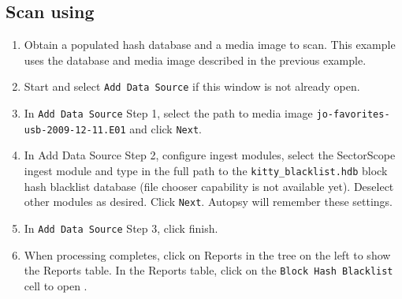 \documentclass[11pt,fleqn]{article} %
\begin{document}
\subsection{Scan using \aut}
\begin{enumerate}
\item Obtain a populated hash database and a media image to scan. This example uses the database and media image described in the previous example.
\item Start \aut and select \verb+Add Data Source+ if this window is not already open.
\item In \verb+Add Data Source+ Step 1, select the path to media image \verb+jo-favorites-usb-2009-12-11.E01+ and click \verb+Next+.
\item In Add Data Source Step 2, configure ingest modules, select the SectorScope ingest module and type in the full path to the \verb+kitty_blacklist.hdb+ block hash blacklist database (file chooser capability is not available yet). Deselect other modules as desired. Click \verb+Next+. Autopsy will remember these settings.
\item In \verb+Add Data Source+ Step 3, click finish.
\item When processing completes, click on Reports in the tree on the left to show the Reports table. In the Reports table, click on the \verb+Block Hash Blacklist+ cell to open \sscope.
\end{enumerate}
\end{document}

